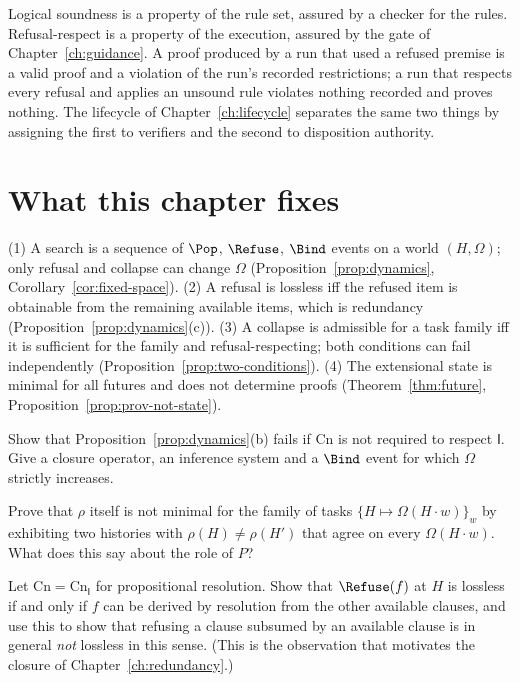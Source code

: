 Logical soundness is a property of the rule set, assured by a checker for the rules. Refusal-respect is a property of the execution, assured by the gate of Chapter~\ref{ch:guidance}. A proof produced by a run that used a refused premise is a valid proof and a violation of the run's recorded restrictions; a run that respects every refusal and applies an unsound rule violates nothing recorded and proves nothing. The lifecycle of Chapter~\ref{ch:lifecycle} separates the same two things by assigning the first to verifiers and the second to disposition authority.

\section{What this chapter fixes}

\begin{principal}
(1) A search is a sequence of $\Pop$, $\Refuse$, $\Bind$ events on a world $(H,\Omega)$; only refusal and collapse can change $\Omega$ (Proposition~\ref{prop:dynamics}, Corollary~\ref{cor:fixed-space}). (2) A refusal is lossless iff the refused item is obtainable from the remaining available items, which is redundancy (Proposition~\ref{prop:dynamics}(c)). (3) A collapse is admissible for a task family iff it is sufficient for the family and refusal-respecting; both conditions can fail independently (Proposition~\ref{prop:two-conditions}). (4) The extensional state is minimal for all futures and does not determine proofs (Theorem~\ref{thm:future}, Proposition~\ref{prop:prov-not-state}).
\end{principal}

\begin{exercise}
Show that Proposition~\ref{prop:dynamics}(b) fails if $\mathrm{Cn}$ is not required to respect $\mathsf I$. Give a closure operator, an inference system and a $\Bind$ event for which $\Omega$ strictly increases.
\end{exercise}

\begin{exercise}
Prove that $\rho$ itself is not minimal for the family of tasks $\{H\mapsto\Omega(H\cdot w)\}_w$ by exhibiting two histories with $\rho(H)\ne\rho(H')$ that agree on every $\Omega(H\cdot w)$. What does this say about the role of $P$?
\end{exercise}

\begin{exercise}
Let $\mathrm{Cn}=\mathrm{Cn}_{\mathsf I}$ for propositional resolution. Show that $\Refuse(f)$ at $H$ is lossless if and only if $f$ can be derived by resolution from the other available clauses, and use this to show that refusing a clause subsumed by an available clause is in general \emph{not} lossless in this sense. (This is the observation that motivates the closure of Chapter~\ref{ch:redundancy}.)
\end{exercise}
